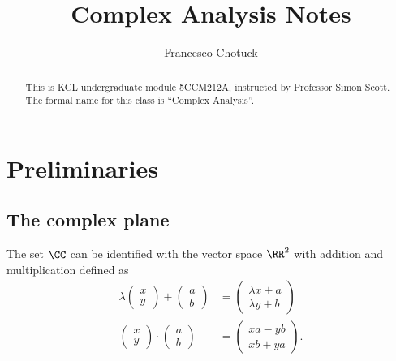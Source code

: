 \documentclass[12pt, a4paper]{article}
\title{Complex Analysis Notes}
\date{}
\author{Francesco Chotuck}
\begin{document}
\maketitle

\begin{abstract}
    This is KCL undergraduate module 5CCM212A, instructed by Professor Simon Scott. The formal name for this class is ``Complex Analysis''.
\end{abstract}

\tableofcontents

\pagebreak

\section{Preliminaries}

\subsection{The complex plane}

The set \(\CC\) can be identified with the vector space \(\RR^2\) with addition and multiplication defined as 
\[\begin{aligned}
    \lambda \begin{pmatrix}
        x \\ y 
    \end{pmatrix} + 
    \begin{pmatrix} 
        a \\b
    \end{pmatrix} &=
    \begin{pmatrix}
        \lambda x+a \\
        \lambda y+b
    \end{pmatrix} \\
    \begin{pmatrix}
        x \\ y 
    \end{pmatrix}
    \cdot
    \begin{pmatrix}
        a \\ b
    \end{pmatrix} &=
    \begin{pmatrix}
        xa-yb \\ xb+ya 
    \end{pmatrix}.
\end{aligned}\]
\end{document}
